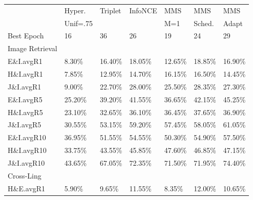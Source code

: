 
\begin{table}
    \centering
\begin{tabular}{l|llllll}
\toprule
{} & Hyper. & Triplet & InfoNCE & MMS & MMS & MMS \\
{} & Unif=.75 &         &         & M=1 & Sched. & Adapt \\
\midrule
Best Epoch  &                   16 &                        36 &                      26 &            19 &                  24 &                  29 \\
Image Retrieval &&&&&&\\
\midrule
\midrule
E\&I.avgR1   &                8.30\% &                    16.40\% &                  18.05\% &        12.65\% &              18.85\% &              16.90\% \\
H\&I.avgR1   &                7.85\% &                    12.95\% &                  14.70\% &        16.15\% &              16.50\% &              14.45\% \\
J\&I.avgR1   &                9.00\% &                    22.70\% &                  28.00\% &        25.50\% &              28.35\% &              27.30\% \\
\midrule
E\&I.avgR5   &               25.20\% &                    39.20\% &                  41.55\% &        36.65\% &              42.15\% &              45.25\% \\
H\&I.avgR5   &               23.10\% &                    32.65\% &                  36.10\% &        36.45\% &              37.65\% &              36.90\% \\
J\&I.avgR5   &               30.55\% &                    53.15\% &                  59.20\% &        57.45\% &              58.05\% &              61.05\% \\
\midrule
E\&I.avgR10  &               36.95\% &                    51.55\% &                  54.55\% &        50.30\% &              54.90\% &              57.50\% \\
H\&I.avgR10  &               33.75\% &                    43.55\% &                  45.85\% &        47.60\% &              46.85\% &              47.15\% \\
J\&I.avgR10  &               43.65\% &                    67.05\% &                  72.35\% &        71.50\% &              71.95\% &              74.40\% \\
\midrule
 Cross-Ling &&&&&&\\
\midrule
\midrule
H\&E.avgR1   &                5.90\% &                     9.65\% &                  11.55\% &         8.35\% &              12.00\% &              10.65\% \\

\end{tabular}
\end{table}
